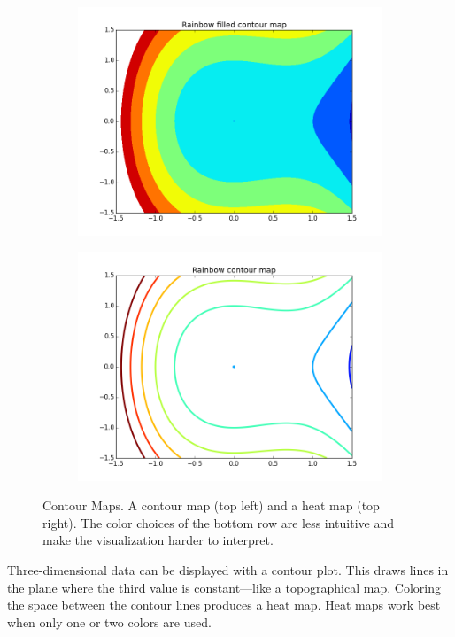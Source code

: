 \begin{figure}[h]
\begin{subfigure}{.45\textwidth}
\includegraphics[width=\textwidth]{contour_map_rainbow_filled.png}
\end{subfigure}
\begin{subfigure}{.45\textwidth}
\centering
\includegraphics[width=\textwidth]{contour_map_rainbow.png}
\end{subfigure}
\caption{Contour Maps.  A contour map (top left) and a heat map (top right).
The color choices of the bottom row are less intuitive and make the visualization harder to interpret.}
\label{fig:contour}
\end{figure}

Three-dimensional data can be displayed with a contour plot.
This draws lines in the plane where the third value is constant---like a topographical map.
Coloring the space between the contour lines produces a heat map.
Heat maps work best when only one or two colors are used.

